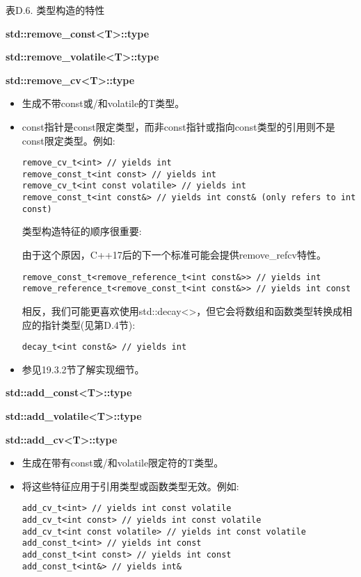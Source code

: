 \begin{center}
表D.6. 类型构造的特性
\end{center}

\textbf{std::remove\_const<T>::type}

\textbf{std::remove\_volatile<T>::type}

\textbf{std::remove\_cv<T>::type}

\begin{itemize}
\item
生成不带const或/和volatile的T类型。

\item
const指针是const限定类型，而非const指针或指向const类型的引用则不是const限定类型。例如:

\begin{lstlisting}[style=styleCXX]
remove_cv_t<int> // yields int
remove_const_t<int const> // yields int
remove_cv_t<int const volatile> // yields int
remove_const_t<int const&> // yields int const& (only refers to int const)
\end{lstlisting}

类型构造特征的顺序很重要:

\begin{tcolorbox}[colback=webgreen!5!white,colframe=webgreen!75!black]
\hspace*{0.75cm}由于这个原因，C++17后的下一个标准可能会提供remove\_refcv特性。
\end{tcolorbox}

\begin{lstlisting}[style=styleCXX]
remove_const_t<remove_reference_t<int const&>> // yields int
remove_reference_t<remove_const_t<int const&>> // yields int const
\end{lstlisting}

相反，我们可能更喜欢使用std::decay<>，但它会将数组和函数类型转换成相应的指针类型(见第D.4节):

\begin{lstlisting}[style=styleCXX]
decay_t<int const&> // yields int
\end{lstlisting}

\item
参见19.3.2节了解实现细节。
\end{itemize}

\textbf{std::add\_const<T>::type}

\textbf{std::add\_volatile<T>::type}

\textbf{std::add\_cv<T>::type}

\begin{itemize}
\item
生成在带有const或/和volatile限定符的T类型。

\item
将这些特征应用于引用类型或函数类型无效。例如:
\begin{lstlisting}[style=styleCXX]
add_cv_t<int> // yields int const volatile
add_cv_t<int const> // yields int const volatile
add_cv_t<int const volatile> // yields int const volatile
add_const_t<int> // yields int const
add_const_t<int const> // yields int const
add_const_t<int&> // yields int&
\end{lstlisting}
\end{itemize}

